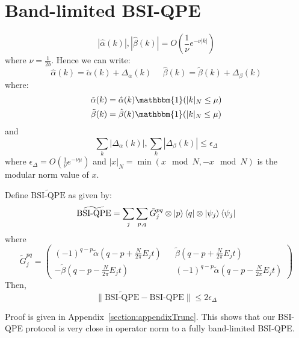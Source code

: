 \section{Band-limited BSI-QPE}
\label{section:band_limited_bsiqpe}
\begin{equation}
    |\hat \alpha(k)|,|\hat \beta(k)| = O\left( \frac{1}{\nu}e^{-\nu |k|}\right)
    \label{eq:scaling}
\end{equation}
where $\nu = \frac{1}{2b}$. Hence we can write:
\begin{equation}
    \hat\alpha(k) = \tilde\alpha(k) + \Delta_{\alpha}(k) \>\>\>\>\>\>\hat\beta(k) = \tilde\beta(k) + \Delta_{\beta}(k)
    \label{eq:decomposealpha}
\end{equation}
where:
\begin{align}
    \tilde\alpha(k) &= \hat\alpha(k)\mathbbm{1}(|k|_{N}\leq \mu)\\
    \tilde\beta(k) &= \hat\beta(k)\mathbbm{1}(|k|_{N}\leq \mu)
    \label{eq:decomposealpha2}
\end{align}  and
\begin{equation}
    \sum_k|\Delta_\alpha(k)|,\sum_k|\Delta_\beta(k)|\leq \epsilon_{\Delta}
    \label{eq:decomposealpha3}
\end{equation} where $\epsilon_{\Delta} = O(\frac{1}{\nu}e^{-\nu \mu})$ and $|x|_N = \min(x \mod N,- x\mod N)$ is the modular norm value of $x$.

\begin{lemma}
\label{lemma:0}
    Define $\widetilde{\text{BSI-QPE}}$ as given by:
    \begin{equation}
       \widetilde{\text{BSI-QPE}}= \sum_j \sum_{p,q} \tilde G^{pq}_j \otimes \ket{p}\bra{q} \otimes \ket{\psi_j}\bra{\psi_j}
    \end{equation}
    where 
    \begin{equation}
        \tilde G^{pq}_j = \left(\begin{smallmatrix}
        (-1)^{q-p}\tilde\alpha(q-p+\frac{N}{2\pi}E_jt) && \tilde\beta(q-p+\frac{N}{2\pi}E_jt)\\
        -\tilde\beta (q-p-\frac{N}{2\pi}E_jt) && (-1)^{q-p}\tilde\alpha(q-p-\frac{N}{2\pi}E_jt)
    \end{smallmatrix}\right)
    \end{equation}
    Then,  
    \begin{equation}
        \|\widetilde{\text{BSI-QPE}}-\text{BSI-QPE}\| \leq 2\epsilon_{\Delta}
    \end{equation}
\end{lemma}
Proof is given in Appendix~\ref{section:appendixTrunc}. This shows that our BSI-QPE protocol is very close in operator norm to a fully band-limited BSI-QPE.

